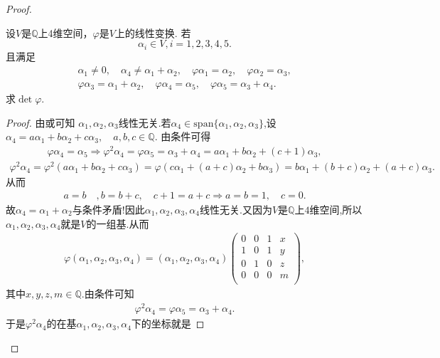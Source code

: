 \documentclass[../../main.tex]{subfiles}
\begin{document}
\begin{proof}
\begin{example}
设$V$是$\mathbb{Q}$上4维空间，$\varphi$是$V$上的线性变换. 若
$$\alpha_i \in V, i = 1,2,3,4,5.$$
且满足
\begin{gather*}
\alpha _1\ne 0,\quad \alpha _4\ne \alpha _1+\alpha _2,\quad \varphi \alpha _1=\alpha _2,\quad \varphi \alpha _2=\alpha _3,
\\
\varphi \alpha _3=\alpha _1+\alpha _2,\quad \varphi \alpha _4=\alpha _5,\quad \varphi \alpha _5=\alpha _3+\alpha _4.
\end{gather*}
求$\det \varphi$.
\end{example}
\begin{proof}
由或可知
$\alpha_1,\alpha_2,\alpha_3$线性无关.若$\alpha_4\in \mathrm{span}\{\alpha_1,\alpha_2,\alpha_3\}$,设
$\alpha_4=a\alpha_1+b\alpha_2+c\alpha_3,\quad a,b,c\in \mathbb{Q}.$
由条件可得
\begin{align*}
\varphi \alpha_4=\alpha_5\Longrightarrow \varphi^2\alpha_4=\varphi \alpha_5=\alpha_3+\alpha_4=a\alpha_1+b\alpha_2+(c+1)\alpha_3,
\end{align*}
\begin{align*}
\varphi^2\alpha_4=\varphi^2(a\alpha_1+b\alpha_2+c\alpha_3)=\varphi\left(c\alpha_1+(a+c)\alpha_2+b\alpha_3\right)=b\alpha_1+(b+c)\alpha_2+(a+c)\alpha_3.
\end{align*}
从而
\begin{align*}
a=b\quad ,b=b+c,\quad c+1=a+c\Longrightarrow a=b=1,\quad c=0.
\end{align*}
故$\alpha_4=\alpha_1+\alpha_2$与条件矛盾!因此$\alpha_1,\alpha_2,\alpha_3,\alpha_4$线性无关.又因为$V$是$\mathbb{Q}$上$4$维空间,所以$\alpha_1,\alpha_2,\alpha_3,\alpha_4$就是$V$的一组基.从而
\begin{align*}
\varphi\left( \alpha_1,\alpha_2,\alpha_3,\alpha_4 \right)=\left( \alpha_1,\alpha_2,\alpha_3,\alpha_4 \right)\begin{pmatrix}
0&		0&		1&		x\\
1&		0&		1&		y\\
0&		1&		0&		z\\
0&		0&		0&		m\\
\end{pmatrix},
\end{align*}
其中$x,y,z,m\in \mathbb{Q}$.由条件可知
\begin{align*}
\varphi^2\alpha_4=\varphi \alpha_5=\alpha_3+\alpha_4.
\end{align*}
于是$\varphi^2\alpha_4$的在基$\alpha_1,\alpha_2,\alpha_3,\alpha_4$下的坐标就是

\end{proof}
\end{proof}
\end{document}
